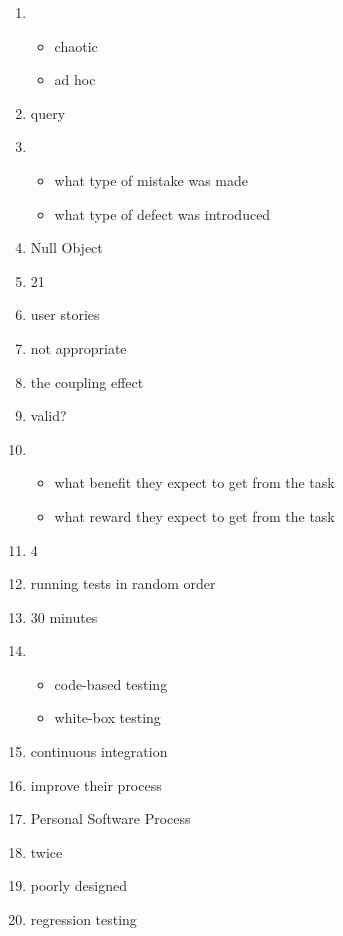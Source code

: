 \documentclass{exam}
\begin{document}
\begin{enumerate}
\item \begin{itemize}
\item chaotic
\item ad hoc
\end{itemize}
\item query
\item \begin{itemize}
\item what type of mistake was made
\item what type of defect was introduced
\end{itemize}
\item Null Object
\item 21
\item user stories
\item not appropriate
\item the coupling effect
\item valid?
\item \begin{itemize}
\item what benefit they expect to get from the task
\item what reward they expect to get from the task
\end{itemize}
\item 4
\item running tests in random order
\item 30 minutes
\item \begin{itemize}
\item code-based testing
\item white-box testing
\end{itemize}
\item continuous integration
\item improve their process
\item Personal Software Process
\item twice
\item poorly designed
\item regression testing
\end{enumerate}
\end{document}
